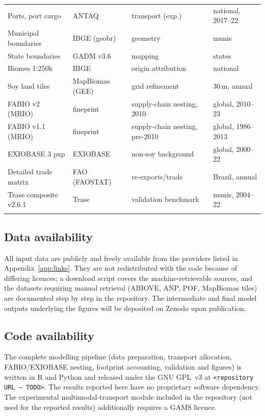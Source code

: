 \documentclass[pdflatex,sn-nature]{sn-jnl}%
\begin{document}
\begin{table}[htbp]
\begin{tabular}{@{}p{3.5cm}p{2.3cm}p{3.0cm}p{2.6cm}@{}}
Ports, port cargo                  & ANTAQ               & transport (exp.)      & national, 2017--22 \\
Municipal boundaries               & IBGE (geobr)        & geometry              & munis \\
State boundaries                   & GADM v3.6           & mapping               & states \\
Biomes 1:250k                      & IBGE                & origin attribution    & national \\
Soy land tiles                     & MapBiomas (GEE)     & grid refinement       & 30\,m, annual \\
FABIO v2 (MRIO)                    & fineprint           & supply-chain nesting, 2010-- & global, 2010--23 \\
FABIO v1.1 (MRIO)                  & fineprint           & supply-chain nesting, pre-2010 & global, 1986--2013 \\
EXIOBASE 3 pxp                     & EXIOBASE            & non-soy background    & global, 2000--22 \\
Detailed trade matrix              & FAO (FAOSTAT)       & re-exports/trade      & Brazil, annual \\
Trase composite v2.6.1             & Trase               & validation benchmark  & munis, 2004--22 \\
\botrule
\end{tabular}
\end{table}

\subsection{Data availability}\label{subsec:data-availability}
All input data are publicly and freely available from the providers listed
in Appendix~\ref{app:links}. They are not redistributed with the code
because of differing licences; a download script covers the
machine-retrievable sources, and the datasets requiring manual retrieval
(ABIOVE, ANP, POF, MapBiomas tiles) are documented step by step in the
repository. The intermediate and final model outputs underlying the figures
will be deposited on Zenodo upon publication.

\subsection{Code availability}\label{subsec:code-availability}
The complete modelling pipeline (data preparation, transport allocation,
FABIO/EXIOBASE nesting, footprint accounting, validation and figures) is
written in R and Python and released under the GNU GPL~v3 at
\texttt{<repository URL --- TODO>}. The results reported here have no
proprietary software dependency. The experimental multimodal-transport
module included in the repository (not used for the reported results)
additionally requires a GAMS licence.
\end{document}
